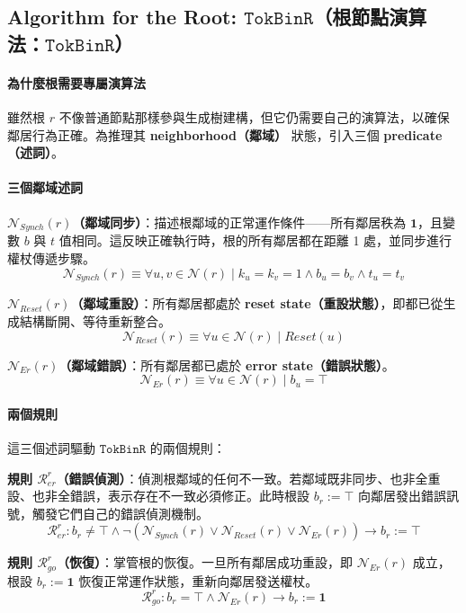 \documentclass[a4paper, 12pt]{article}
\newcommand{\bo}{\mathbf{1}}
\newcommand{\rk}{k}
\newcommand{\RerRoot}{\mathscr{R}^r_{er}}
\newcommand{\Rgo}{\mathscr{R}^r_{go}}
\begin{document}
\subsection{Algorithm for the Root: \(\mathtt{TokBinR}\)（根節點演算法：\(\mathtt{TokBinR}\)）}
\label{subsec:TokBinR}

\paragraph{為什麼根需要專屬演算法}
雖然根 \(r\) 不像普通節點那樣參與生成樹建構，但它仍需要自己的演算法，以確保鄰居行為正確。為推理其 \textbf{neighborhood（鄰域）} 狀態，引入三個 \textbf{predicate（述詞）}。

\paragraph{三個鄰域述詞}
\textbf{\(\mathcal{N}_{Synch}(r)\)（鄰域同步）}：描述根鄰域的正常運作條件——所有鄰居秩為 \(\bo\)，且變數 \(b\) 與 \(t\) 值相同。這反映正確執行時，根的所有鄰居都在距離 1 處，並同步進行權杖傳遞步驟。
\[
\mathcal{N}_{Synch}(r)\equiv \forall u,v\in \mathcal{N}(r)\mid \rk_u=\rk_v=1\wedge b_u=b_v\wedge t_u=t_v
\]

\textbf{\(\mathcal{N}_{Reset}(r)\)（鄰域重設）}：所有鄰居都處於 \textbf{reset state（重設狀態）}，即都已從生成結構斷開、等待重新整合。
\[
\mathcal{N}_{Reset}(r)\equiv \forall u\in \mathcal{N}(r)\mid Reset(u)
\]

\textbf{\(\mathcal{N}_{Er}(r)\)（鄰域錯誤）}：所有鄰居都已處於 \textbf{error state（錯誤狀態）}。
\[
\mathcal{N}_{Er}(r)\equiv \forall u\in \mathcal{N}(r)\mid b_u=\top
\]

\paragraph{兩個規則}
這三個述詞驅動 \(\mathtt{TokBinR}\) 的兩個規則：

\textbf{規則 \(\RerRoot\)（錯誤偵測）}：偵測根鄰域的任何不一致。若鄰域既非同步、也非全重設、也非全錯誤，表示存在不一致必須修正。此時根設 \(b_r:=\top\) 向鄰居發出錯誤訊號，觸發它們自己的錯誤偵測機制。
\[
\RerRoot : b_r\neq\top \wedge \neg(\mathcal{N}_{Synch}(r)\vee \mathcal{N}_{Reset}(r)\vee \mathcal{N}_{Er}(r))\longrightarrow b_r:=\top
\]

\textbf{規則 \(\Rgo\)（恢復）}：掌管根的恢復。一旦所有鄰居成功重設，即 \(\mathcal{N}_{Er}(r)\) 成立，根設 \(b_r:=\bo\) 恢復正常運作狀態，重新向鄰居發送權杖。
\[
\Rgo : b_r=\top \wedge \mathcal{N}_{Er}(r) \longrightarrow b_r:=\mathbf{1}
\]
\end{document}
